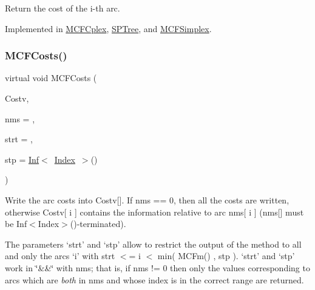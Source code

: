 Return the cost of the i-\/th arc. 

Implemented in \mbox{\hyperlink{class_m_c_f_cplex_a929a5d13c65f3e297d2f8aef321aaab3}{M\+C\+F\+Cplex}}, \mbox{\hyperlink{class_s_p_tree_ae8d376071c83375949461c34d5186b40}{S\+P\+Tree}}, and \mbox{\hyperlink{class_m_c_f_simplex_ae8d376071c83375949461c34d5186b40}{M\+C\+F\+Simplex}}.

\mbox{\label{class_m_c_f_class_ab6dbac4cde9477589de653081986abb4}} 
\subsubsection{\texorpdfstring{M\+C\+F\+Costs()}{MCFCosts()}\hspace{0.1cm}{\footnotesize\ttfamily [1/2]}}
{\footnotesize\ttfamily virtual void M\+C\+F\+Costs (\begin{DoxyParamCaption}\item[{\mbox{\hyperlink{class_m_c_f_class_a62409402be4e4b301e1a568f99f877be}{C\+Row}}}]{Costv,  }\item[{\mbox{\hyperlink{class_m_c_f_class_a81575b2d4e4d5636b17170432150ae69}{c\+Index\+\_\+\+Set}}}]{nms = {},  }\item[{\mbox{\hyperlink{class_m_c_f_class_a76aaabb20535c51a2752b93f6c38fe54}{c\+Index}}}]{strt = {},  }\item[{\mbox{\hyperlink{class_m_c_f_class_ad53d6229d7ec28555a9c9c2fd9abf773}{Index}}}]{stp = {\ttfamily \mbox{\hyperlink{class_o_p_ttypes__di__unipi__it_1_1_inf}{Inf}}$<$~\mbox{\hyperlink{class_m_c_f_class_ad53d6229d7ec28555a9c9c2fd9abf773}{Index}}~$>$()} }\end{DoxyParamCaption})\hspace{0.3cm}{\ttfamily [pure virtual]}}

Write the arc costs into Costv\mbox{[}\mbox{]}. If nms == 0, then all the costs are written, otherwise Costv\mbox{[} i \mbox{]} contains the information relative to arc nms\mbox{[} i \mbox{]} (nms\mbox{[}\mbox{]} must be Inf$<$\+Index$>$()-\/terminated).

The parameters `strt' and `stp' allow to restrict the output of the method to all and only the arcs `i' with strt $<$= i $<$ min( M\+C\+Fm() , stp ). `strt' and `stp' work in \char`\"{}\&\&\char`\"{} with nms; that is, if nms != 0 then only the values corresponding to arcs which are {\itshape both} in nms and whose index is in the correct range are returned. 


